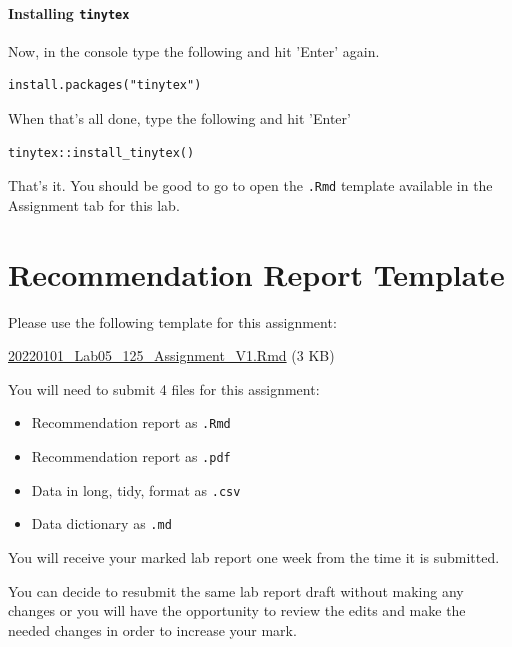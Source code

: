 \documentclass[
]{book}
\providecommand{\tightlist}{%
  \setlength{\itemsep}{0pt}\setlength{\parskip}{0pt}}
\begin{document}
\hypertarget{installing-tinytex}{%
\subsubsection*{\texorpdfstring{Installing \texttt{tinytex}}{Installing tinytex}}\label{installing-tinytex}}

Now, in the console type the following and hit 'Enter' again.

\begin{verbatim}
install.packages("tinytex")
\end{verbatim}

When that's all done, type the following and hit 'Enter'

\begin{verbatim}
tinytex::install_tinytex()
\end{verbatim}

That's it. You should be good to go to open the \texttt{.Rmd} template available in the Assignment tab for this lab.

\hypertarget{recommendation-report-template}{%
\chapter*{Recommendation Report Template}\label{recommendation-report-template}}

Please use the following template for this assignment:

\href{files/report/20220101_Lab05_125_Assignment_V1.Rmd}{20220101\_Lab05\_125\_Assignment\_V1.Rmd} (3 KB)

You will need to submit 4 files for this assignment:

\begin{itemize}
\tightlist
\item
  Recommendation report as \texttt{.Rmd}
\item
  Recommendation report as \texttt{.pdf}
\item
  Data in long, tidy, format as \texttt{.csv}
\item
  Data dictionary as \texttt{.md}
\end{itemize}

You will receive your marked lab report one week from the time it is submitted.

You can decide to resubmit the same lab report draft without making any changes or you will have the opportunity to review the edits and make the needed changes in order to increase your mark.
\end{document}
